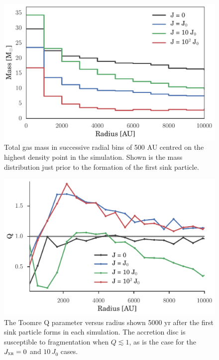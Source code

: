 \documentclass{thesis}
\newcommand{\jxr}{\ensuremath{J_{\textsc{xr}}}\xspace}
\begin{document}
\begin{figure}
  \begin{center}
    \includegraphics[width=\columnwidth]{figures/radial_bins/mass_bins}
    \caption{Total gas mass in successive radial bins of 500 AU centred on the highest density point in the simulation.  Shown is the mass distribution just prior to the formation of the first sink particle.}
    \label{mbins}
  \end{center}
\end{figure}

\begin{figure}
  \begin{center}
    \includegraphics[width=\columnwidth]{figures/radial_bins/toomreQ}
    \caption{The Toomre Q parameter versus radius shown 5000 yr after the first sink particle forms in each simulation.  The accretion disc is susceptible to fragmentation when $Q\lesssim1$, as is the case for the  $\jxr= 0$ and $10\,J_0$ cases.}
    \label{toomreQ}
  \end{center}
\end{figure}
\end{document}
